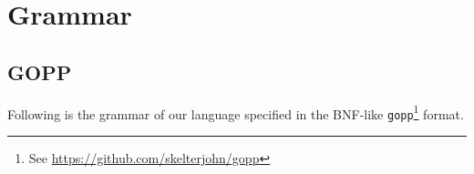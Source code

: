 \documentclass[10pt]{article}
\begin{document}
\pagebreak

\section{Grammar}

\subsection{GOPP}

Following is the grammar of our language specified in the BNF-like
\texttt{gopp}\footnote{See \url{https://github.com/skelterjohn/gopp}} format.



%
%
%
%
%
%
%
%
%
%
%
%
%
%
%
%
%
%
%
%
%
%
\end{document}

